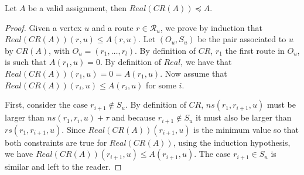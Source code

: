 \begin{lemma}\label{lemma:prec}
Let $A$ be a valid assignment, then $Real(CR(A)) \preceq A$.
\end{lemma}
\begin{proof}
Given a vertex $u$ and a route $r \in \mathcal{R}_u$, we prove by induction that $Real(CR(A))(r,u) \leq A(r,u)$.
Let $(O_u,S_u)$ be the pair associated to $u$ by $CR(A)$, with $O_u = (r_1,\dots,r_l)$. By definition of $CR$, $r_1$ the first route in $O_u$, is such that $A(r_1,u) = 0$. By definition of $Real$, we have that  $Real(CR(A))(r_1,u) = 0 = A(r_1,u)$.
Now assume that $Real(CR(A))(r_i,u) \leq A(r_i,u)$ for some $i$. 

First, consider the case $r_{i+1} \notin S_u$. By definition of $CR$, $ns(r_1,r_{i+1},u)$ must be larger than 
$ns(r_1,r_{i},u)+ \tau$ and because $r_{i+1} \notin S_u$ it must also be larger than $rs(r_1,r_{i+1},u)$. 
Since $Real(CR(A))(r_{i+1},u)$ is the minimum value so that both constraints are true for $Real(CR(A))$, using
the induction hypothesis, we have $Real(CR(A))(r_{i+1},u) \leq A(r_{i+1},u)$. The case $r_{i+1} \in S_u$ is similar and left to the reader.
\end{proof}


% 
% 
% 
% 
% 


